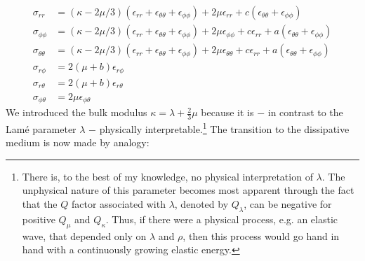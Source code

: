 \begin{subequations}\label{E:setup32}
\begin{align}
\sigma_{rr}&=(\kappa-2\mu/3)(\epsilon_{rr}+\epsilon_{\theta\theta}+\epsilon_{\phi\phi})+2\mu\epsilon_{rr}+c(\epsilon_{\theta\theta}+\epsilon_{\phi\phi})\\
\sigma_{\phi\phi}&=(\kappa-2\mu/3)(\epsilon_{rr}+\epsilon_{\theta\theta}+\epsilon_{\phi\phi})+2\mu\epsilon_{\phi\phi}+c\epsilon_{rr}+a(\epsilon_{\theta\theta}+\epsilon_{\phi\phi})\\
\sigma_{\theta\theta}&=(\kappa-2\mu/3)(\epsilon_{rr}+\epsilon_{\theta\theta}+\epsilon_{\phi\phi})+2\mu\epsilon_{\theta\theta}+c\epsilon_{rr}+a(\epsilon_{\theta\theta}+\epsilon_{\phi\phi})\\
\sigma_{r\phi}&=2(\mu+b)\epsilon_{r\phi}\\
\sigma_{r\theta}&=2(\mu+b)\epsilon_{r\theta}\\
\sigma_{\phi\theta}&=2\mu\epsilon_{\phi\theta}
\end{align}
\end{subequations}
We introduced the bulk modulus $\kappa=\lambda+\frac{2}{3}\mu$
because it is $-$ in contrast to the Lam\'{e} parameter $\lambda$ $-$
physically interpretable.\footnote{\textsf{There is, to the best of
my knowledge, no physical interpretation of $\lambda$. The
unphysical nature of this parameter becomes most apparent through
the fact that the $Q$ factor associated with $\lambda$, denoted by
$Q_\lambda$, can be negative for positive $Q_\mu$ and $Q_\kappa$.
Thus, if there were a physical process, e.g. an elastic wave, that
depended only on $\lambda$ and $\rho$, then this process would go
hand in hand with a continuously growing elastic energy.}} The
transition to the dissipative medium is now made by analogy:
